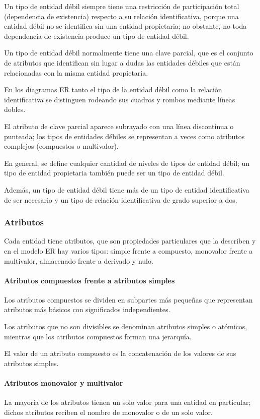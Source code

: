 Un tipo de entidad débil siempre tiene una restricción de participación total (dependencia de existencia) respecto a su relación identificativa, porque una entidad débil no se identifica sin una entidad propietaria; no obstante, no toda dependencia de existencia produce un tipo de entidad débil.


Un tipo de entidad débil normalmente tiene una clave parcial, que es el conjunto de atributos que identifican sin lugar a dudas las entidades débiles que están relacionadas con la misma entidad propietaria. 


En los diagramas ER tanto el tipo de la entidad débil como la relación identificativa se distinguen rodeando sus cuadros y rombos mediante líneas dobles.


El atributo de clave parcial aparece subrayado con una línea discontinua o punteada; los tipos de entidades débiles se representan a veces como atributos complejos (compuestos o multivalor). 


En general, se define cualquier cantidad de niveles de tipos de entidad débil; un tipo de entidad propietaria también puede ser un tipo de entidad débil. 


Además, un tipo de entidad débil tiene más de un tipo de entidad identificativa de ser necesario y un tipo de relación identificativa de grado superior a dos.

\subsubsection{Atributos}
Cada entidad tiene atributos, que son propiedades particulares que la describen y en el modelo ER hay varios tipos: simple frente a compuesto, monovalor frente a multivalor, almacenado frente a derivado y nulo.


\paragraph*{Atributos compuestos frente a atributos simples} Los atributos compuestos se dividen en subpartes más pequeñas que representan atributos más básicos con significados independientes.


Los atributos que no son divisibles se denominan atributos simples o atómicos, mientras que los atributos compuestos forman una jerarquía. 


El valor de un atributo compuesto es la concatenación de los valores de sus atributos simples.

\paragraph*{Atributos monovalor y multivalor}  La mayoría de los atributos tienen un solo valor para una entidad en particular; dichos atributos reciben el nombre de monovalor o de un solo valor. 


